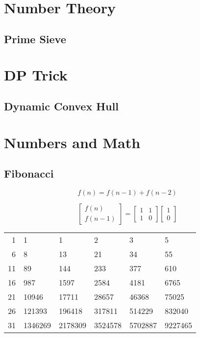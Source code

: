 \documentclass[twocolumn]{article}
\begin{document}
\section{Number Theory}

\subsection{Prime Sieve}


\section{DP Trick}

\subsection{Dynamic Convex Hull}


\section{Numbers and Math}

\subsection{Fibonacci}

$$f(n)=f(n-1)+f(n-2)$$

\begin{equation*}
    \begin{bmatrix}
        f(n) \\
        f(n - 1)
    \end{bmatrix}
    =
    \begin{bmatrix}
        1 & 1 \\
        1 & 0
    \end{bmatrix}
    \begin{bmatrix}
        1 \\
        0
    \end{bmatrix}
\end{equation*}

\begin{tabular}{r|lllll}
    1 & 1 & 1 & 2 & 3 & 5 \\
    6 & 8 & 13 & 21 & 34 & 55\\
    11 & 89 & 144 & 233 & 377 & 610 \\
    16 & 987 & 1597 & 2584 & 4181 & 6765\\
    21 & 10946 & 17711 & 28657 & 46368 & 75025 \\
    26 & 121393 & 196418 & 317811 & 514229 & 832040 \\
    31 & 1346269 & 2178309 & 3524578 & 5702887 & 9227465 \\
\end{tabular}
\end{document}
